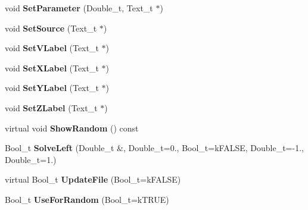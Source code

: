 \begin{DoxyCompactItemize}
\item 
\hypertarget{classTSplineFit_a0950d1debe4cca5ea5d4150ed65263ec}{void {\bfseries Set\-Parameter} (Double\-\_\-t, Text\-\_\-t $\ast$)}\label{classTSplineFit_a0950d1debe4cca5ea5d4150ed65263ec}

\item 
\hypertarget{classTSplineFit_a6bc51fc7586bb6bb8bf03574cd5e15dc}{void {\bfseries Set\-Source} (Text\-\_\-t $\ast$)}\label{classTSplineFit_a6bc51fc7586bb6bb8bf03574cd5e15dc}

\item 
\hypertarget{classTSplineFit_a97cb2923e7e3acefe267638f87b42aa1}{void {\bfseries Set\-V\-Label} (Text\-\_\-t $\ast$)}\label{classTSplineFit_a97cb2923e7e3acefe267638f87b42aa1}

\item 
\hypertarget{classTSplineFit_af899b25d4471ad44dd5b69bf1705ab99}{void {\bfseries Set\-X\-Label} (Text\-\_\-t $\ast$)}\label{classTSplineFit_af899b25d4471ad44dd5b69bf1705ab99}

\item 
\hypertarget{classTSplineFit_a28a02bc20b7e0346e5c65d19a208a30d}{void {\bfseries Set\-Y\-Label} (Text\-\_\-t $\ast$)}\label{classTSplineFit_a28a02bc20b7e0346e5c65d19a208a30d}

\item 
\hypertarget{classTSplineFit_a624b84677474df077d7fb1d6e46c0444}{void {\bfseries Set\-Z\-Label} (Text\-\_\-t $\ast$)}\label{classTSplineFit_a624b84677474df077d7fb1d6e46c0444}

\item 
\hypertarget{classTSplineFit_acd08647d3a4dd26e084a3b9cce9ee3a2}{virtual void {\bfseries Show\-Random} () const }\label{classTSplineFit_acd08647d3a4dd26e084a3b9cce9ee3a2}

\item 
\hypertarget{classTSplineFit_a29752fab78d66c7e24dba5e264088209}{Bool\-\_\-t {\bfseries Solve\-Left} (Double\-\_\-t \&, Double\-\_\-t=0., Bool\-\_\-t=k\-F\-A\-L\-S\-E, Double\-\_\-t=-\/1., Double\-\_\-t=1.)}\label{classTSplineFit_a29752fab78d66c7e24dba5e264088209}

\item 
\hypertarget{classTSplineFit_aae998f6b3a09fc64035a7317664d148e}{virtual Bool\-\_\-t {\bfseries Update\-File} (Bool\-\_\-t=k\-F\-A\-L\-S\-E)}\label{classTSplineFit_aae998f6b3a09fc64035a7317664d148e}

\item 
\hypertarget{classTSplineFit_a6e198070afef0cfb8e9275cafca3a4b5}{Bool\-\_\-t {\bfseries Use\-For\-Random} (Bool\-\_\-t=k\-T\-R\-U\-E)}\label{classTSplineFit_a6e198070afef0cfb8e9275cafca3a4b5}


\end{DoxyCompactItemize}
